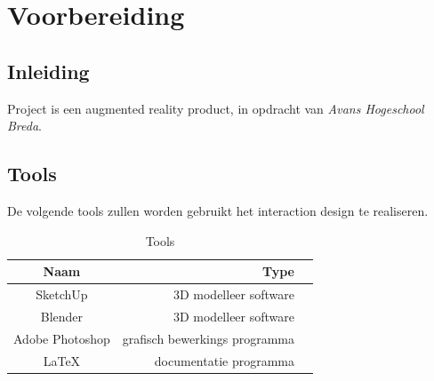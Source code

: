 \chapter{Voorbereiding} \label{cha:voorbereiding}

\section{Inleiding} \label{sec:inleiding}
Project \projectname is een augmented reality product, in opdracht van \textit{Avans Hogeschool Breda}.

\section{Tools} \label{sec:tools}
De volgende tools zullen worden gebruikt het interaction design te realiseren.

\begin{table}[h]
  \centering
  \caption{Tools}
  \label{tb:table}
  \begin{tabular}{crl}
    \toprule
    Naam     & Type\\
    \midrule
    SketchUp     & 3D modelleer software\\
    Blender  & 3D modelleer software\\
    Adobe Photoshop & grafisch bewerkings programma\\
    LaTeX & documentatie programma\\
    \bottomrule
  \end{tabular}
\end{table}

\newpage
